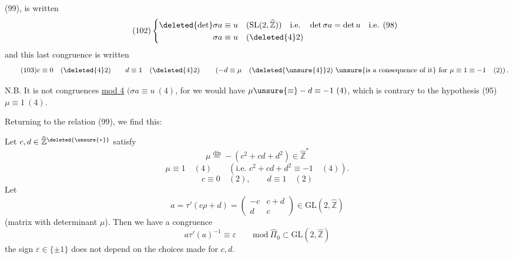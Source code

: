 
  (99),
 is written
\[
\tag{102}
\left\{\begin{aligned}
\deleted{\det}\sigma a&\equiv u\quad
(\mathrm{SL}(2,\widehat{\mathbb Z}))\quad\text{i.e.}\quad
\det\sigma a=\det u\quad\text{i.e. (98)}\\
\sigma a&\equiv u\quad(\deleted{4}2)
\end{aligned}\right.
\]
 and this last congruence is written
\[
\tag{103}
c\equiv0\quad(\deleted{4}2)\qquad d\equiv1\quad(\deleted{4}2)
\qquad
\left(-d\equiv\mu\quad(\deleted{\unsure{4}}2)\ \text{\unsure{is a consequence of it}}
\ \text{for }\mu\equiv1\equiv-1\quad(2)\right).
\]

N.B. It is not  
congruences \uline{mod 4}
$(\sigma a\equiv u\ (4)$, for we would have
$\mu\unsure{\equiv}-d\equiv-1\ (4)$, which is contrary to the hypothesis
(95) $\mu\equiv1\ (4)$.


Returning to the relation (99), we find this:

  Let
$c,d\in\widehat{\mathbb Z}^{\deleted{\unsure{*}}}$ satisfy
\[
\tag{104}
\mu\overset{\mathrm{dfn}}{=}-(c^2+cd+d^2)\in\widehat{\mathbb Z}^{*}
\]
\[
\tag{105}
\mu\equiv1\quad(4)\qquad
(\text{i.e. }c^2+cd+d^2\equiv-1\quad(4)).
\]
\[
\tag{106}
c\equiv0\quad(2),\qquad d\equiv1\quad(2)
\]
Let  
\[
\tag{107}
a=\tau'(c\rho+d)=
\begin{pmatrix}-c&c+d\\d&c\end{pmatrix}
\in\mathrm{GL}(2,\widehat{\mathbb Z})
\]
(matrix with determinant $\mu$). Then we have a congruence
\[
\tag{108}
a\tau'(a)^{-1}\equiv\varepsilon\qquad
\mathrm{mod}\ \widehat{\Pi}_0\subset\mathrm{GL}(2,\widehat{\mathbb Z})
\]
 the sign $\varepsilon\in\{\pm1\}$ does not depend on the
choices made for $c,d$.

